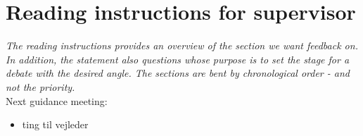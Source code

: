 \chapter*{Reading instructions for supervisor}

\textit{The reading instructions provides an overview of the section we want feedback on. In addition, the statement also questions whose purpose is to set the stage for a debate with the desired angle. The sections are bent by chronological order - and not the priority.} \\

Next guidance meeting: 

\begin{itemize}
\item ting til vejleder
\end{itemize}
